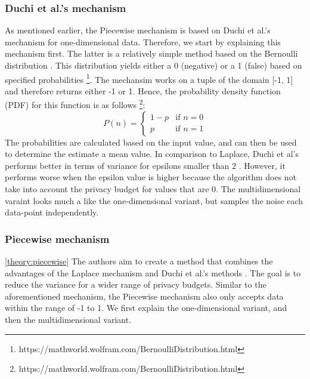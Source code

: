 \subsubsection{Duchi et al.'s mechanism}
As mentioned earlier, the Piecewise mechanism is based on Duchi et al.'s mechanism for one-dimensional data.
Therefore, we start by explaining this mechanism first.
The latter is a relatively simple method based on the Bernoulli distribution \citep{duchi_minimax_2017}.
This distribution yields either a 0 (negative) or a 1 (false) based on specified probabilities \footnote{https://mathworld.wolfram.com/BernoulliDistribution.html}.
The mechansim works on a tuple of the domain [-1, 1] and therefore returns either -1 or 1.
Hence, the probability density function (PDF) for this function is as follows \footnote{https://mathworld.wolfram.com/BernoulliDistribution.html}:
\begin{equation}
    P(n) =
    \begin{cases}
        1 - p & \text{if } n = 0 \\
        p     & \text{if } n = 1
    \end{cases}
\end{equation}
The probabilities are calculated based on the input value, and can then be used to determine the estimate a mean value.
In comparison to Laplace, Duchi et al's performs better in terms of variance for epsilons smaller than 2 \citep{wang_collecting_2019}.
However, it performs worse when the epsilon value is higher because the algorithm does not take into account the privacy budget for values that are 0.
The multidimensional varaint looks much a like the one-dimensional variant, but samples the noise each data-point independently.

\subsubsection*{Piecewise mechanism} \ref{theory:piecewise}
The authors aim to create a method that combines the advantages of the Laplace mechanism and Duchi et al.'s methods \citep{wang_collecting_2019}.
The goal is to reduce the variance for a wider range of privacy budgets.
Similar to the aforementioned mechanism, the Piecewise mechanism also only accepts data within the range of -1 to 1.
We first explain the one-dimensional variant, and then the multidimensional variant.

